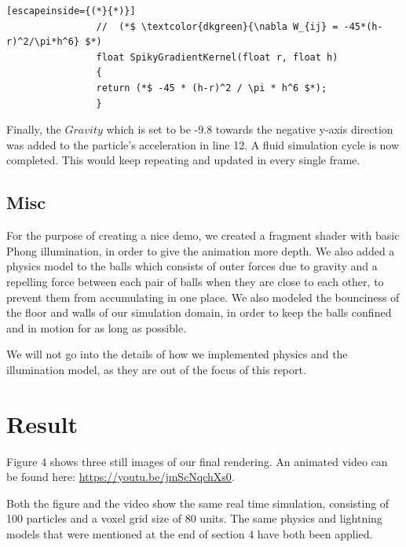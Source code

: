 \documentclass{article}
\begin{document}
\begin{multicols}{2}
			\noindent
	        \begin{minipage}{\linewidth}
	        	\begin{lstlisting}[escapeinside={(*}{*)}]
	        	//  (*$ \textcolor{dkgreen}{\nabla W_{ij} = -45*(h-r)^2/\pi*h^6} $*)
	        	float SpikyGradientKernel(float r, float h)
	        	{
	        	return (*$ -45 * (h-r)^2 / \pi * h^6 $*);
	        	}
	        	\end{lstlisting}
	        \end{minipage}
        
        	Finally, the $Gravity$ which is set to be -9.8 towards the negative y-axis direction was added to the particle's acceleration in line 12. A fluid simulation cycle is now completed. This would keep repeating and updated in every single frame. 

        \subsection{Misc}
            For the purpose of creating a nice demo, we created a fragment shader with basic Phong illumination, in order to give the animation more depth.
            We also added a physics model to the balls which consists of outer forces due to gravity and a repelling force between each pair of balls when they are close to each other, to prevent them from accumulating in one place.
            We also modeled the bounciness of the floor and walls of our simulation domain, in order to keep the balls confined and in motion for as long as possible.

            We will not go into the details of how we implemented physics and the illumination model, as they are out of the focus of this report.

    \section{Result}
        Figure 4 shows three still images of our final rendering. 
        An animated video can be found here:
        \url{https://youtu.be/jmScNqchXs0}.

        Both the figure and the video show the same real time simulation, consisting of 100 particles and a voxel grid size of 80 units.
        The same physics and lightning models that were mentioned at the end of section 4 have both been applied.


\end{multicols}
\end{document}

